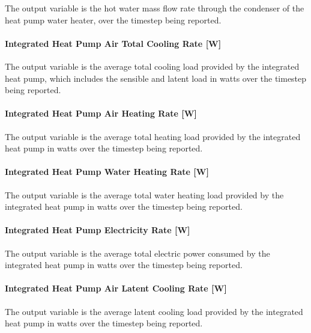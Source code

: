 The output variable is the hot water mass flow rate through the condenser of the heat pump water heater, over the timestep being reported.

\paragraph{Integrated Heat Pump Air Total Cooling Rate {[}W{]}}\label{Out-Cooling-Coil-Total-Cooling-Rate-ASIHP}

The output variable is the average total cooling load provided by the integrated heat pump, which includes the sensible and latent load in watts over the timestep being reported.


\paragraph{Integrated Heat Pump Air Heating Rate {[}W{]}}\label{Out-Heating-Total-Air-Heating-Rate-ASIHP}

The output variable is the average total heating load provided by the integrated heat pump in watts over the timestep being reported.


\paragraph{Integrated Heat Pump Water Heating Rate {[}W{]}}\label{Out-Total-Water-Heating-Rate-ASIHP}

The output variable is the average total water heating load provided by the integrated heat pump in watts over the timestep being reported.

\paragraph{Integrated Heat Pump Electricity Rate {[}W{]}}\label{Out-Total-Electric-Power-ASIHP}

The output variable is the average total electric power consumed by the integrated heat pump in watts over the timestep being reported.


\paragraph{Integrated Heat Pump Air Latent Cooling Rate {[}W{]}}\label{Out-Total-Latent-Cooling-Rate-ASIHP}

The output variable is the average latent cooling load provided by the integrated heat pump in watts over the timestep being reported.

